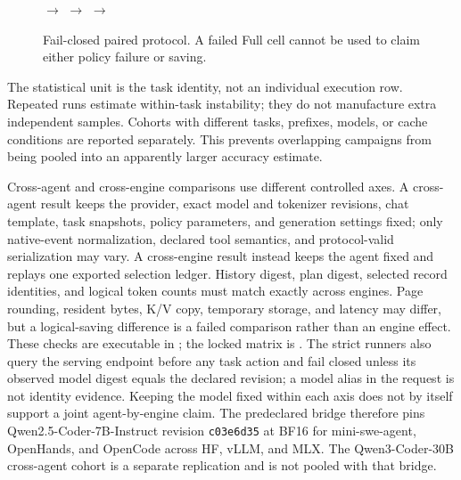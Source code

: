 \documentclass[11pt]{article}
\begin{document}
\begin{figure}[H]
\centering
\small
{}
$\longrightarrow$
$\longrightarrow$
$\longrightarrow$
\caption{Fail-closed paired protocol.  A failed Full cell cannot be used to
claim either policy failure or saving.}
\label{fig:paired-protocol}
\end{figure}

The statistical unit is the task identity, not an individual execution row.
Repeated runs estimate within-task instability; they do not manufacture extra
independent samples.  Cohorts with different tasks, prefixes, models, or cache
conditions are reported separately.  This prevents overlapping campaigns from
being pooled into an apparently larger accuracy estimate.

Cross-agent and cross-engine comparisons use different controlled axes.  A
cross-agent result keeps the provider, exact model and tokenizer revisions,
chat template, task snapshots, policy parameters, and generation settings
fixed; only native-event normalization, declared tool semantics, and
protocol-valid serialization may vary.  A cross-engine result instead keeps
the agent fixed and replays one exported selection ledger.  History digest,
plan digest, selected record identities, and logical token counts must match
exactly across engines.  Page rounding, resident bytes, K/V copy, temporary
storage, and latency may differ, but a logical-saving difference is a failed
comparison rather than an engine effect.  These checks are executable in
; the locked matrix is
.
The strict runners also query the serving endpoint before any task action and
fail closed unless its observed model digest equals the declared revision; a
model alias in the request is not identity evidence.
Keeping the model fixed within each axis does not by itself support a joint
agent-by-engine claim.  The predeclared bridge therefore pins
Qwen2.5-Coder-7B-Instruct revision \texttt{c03e6d35} at BF16 for
mini-swe-agent, OpenHands, and OpenCode across HF, vLLM, and MLX.  The Qwen3-Coder-30B
cross-agent cohort is a separate replication and is not pooled with that
bridge.
\end{document}
